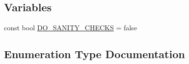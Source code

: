 \subsection*{Variables}
\begin{DoxyCompactItemize}
\item 
const bool \hyperlink{namespaceuva_1_1smt_1_1logging_a0af6ce164f81f81fa576ec8f3740848a}{D\+O\+\_\+\+S\+A\+N\+I\+T\+Y\+\_\+\+C\+H\+E\+C\+K\+S} = false
\end{DoxyCompactItemize}


\subsection{Enumeration Type Documentation}
\hypertarget{namespaceuva_1_1smt_1_1logging_ab82295a1c88a9605285d504893855427}{}
